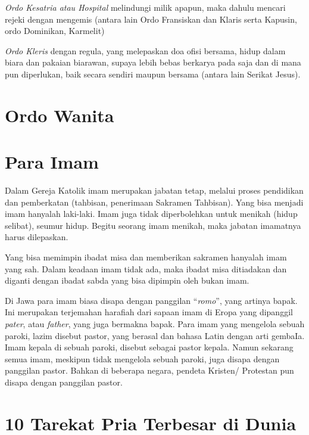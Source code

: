 \textit{Ordo Kesatria atau Hospital} melindungi milik apapun, maka dahulu mencari rejeki dengan mengemis (antara lain Ordo Fransiskan dan Klaris serta Kapusin, ordo Dominikan, Karmelit)

\textit{Ordo Kleris} dengan regula, yang melepaskan doa ofisi bersama, hidup dalam biara dan pakaian biarawan, supaya lebih bebas berkarya pada saja dan di mana pun diperlukan, baik secara sendiri maupun bersama (antara lain Serikat Jesus).

\section*{Ordo Wanita}

\section*{Para Imam}

Dalam Gereja Katolik imam merupakan jabatan tetap,
melalui proses pendidikan  dan pemberkatan  (tahbisan,
penerimaan Sakramen Tahbisan). Yang bisa menjadi imam
hanyalah laki-laki.  Imam juga tidak
diperbolehkan untuk menikah (hidup selibat), seumur hidup.
Begitu seorang imam menikah, maka jabatan imamatnya harus
dilepaskan. 

Yang bisa memimpin ibadat misa dan memberikan sakramen
hanyalah imam yang sah. Dalam keadaan imam tidak
ada, maka ibadat misa ditiadakan dan diganti dengan ibadat
sabda yang bisa dipimpin oleh bukan imam. 

Di Jawa para imam biasa disapa dengan panggilan
``\textit{romo}'', yang artinya bapak. Ini merupakan terjemahan
harafiah dari sapaan imam di Eropa yang dipanggil \textit{pater}, atau
\textit{father}, yang juga bermakna bapak. Para imam yang mengelola
sebuah paroki, lazim disebut pastor, yang berasal dan bahasa
Latin dengan arti gembaIa. Imam kepala di sebuah paroki,
disebut sebagai pastor kepala. Namun sekarang semua imam,
meskipun tidak mengelola sebuah paroki, juga disapa dengan
panggilan pastor. Bahkan di beberapa negara, pendeta Kristen/
Protestan pun disapa dengan panggilan pastor. 


\section*{10 Tarekat Pria Terbesar di Dunia}


